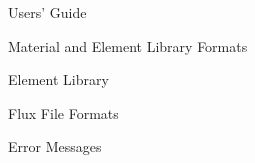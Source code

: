 \begin{chapter}{Users' Guide\label{app:user.guide}}
\begin{section}{Material and Element Library Formats}
\begin{subsection}{Element Library\label{app:user.elelib}}
    \end{subsection}

  \end{section}


  \begin{section}{Flux File Formats}\label{app:flux_files}
  \end{section}
  \begin{section}{Error Messages}\label{app:errors}
  \end{section}
  

\end{chapter}

